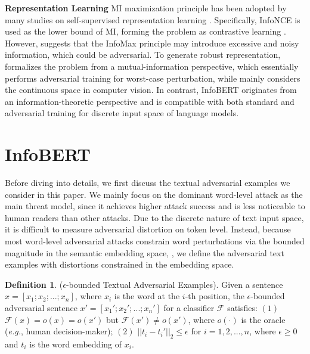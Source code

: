 \documentclass{article} \usepackage{iclr2021_conference,times}
\theoremstyle{definition}
\newtheorem{definition}{Definition}[section]
\theoremstyle{remark}
\newcommand{\method}{InfoBERT\xspace}
\newcommand{\modified}[1]{{\color{black}{#1}}}
\begin{document}
\textbf{Representation Learning} MI maximization principle has been adopted by many studies on self-supervised representation learning \citep{infonce,pmlr-v80-belghazi18a,hjelm2018learning,simclr}. Specifically, InfoNCE \citep{infonce} is used as the lower bound of MI, forming the problem as contrastive learning \citep{DBLP:conf/icml/SaunshiPAKK19, yu2020finetuning}. However, \citet{infomin} suggests that the InfoMax \citep{DBLP:journals/computer/Linsker88} principle may introduce excessive and noisy information, which could be adversarial. 
To generate robust representation, \citet{worstcase} formalizes the problem from a mutual-information perspective, which essentially performs adversarial training for worst-case perturbation, while mainly considers the continuous space in computer vision. In contrast, \method originates from an information-theoretic perspective and is compatible with both standard and adversarial training for discrete input space of language models.






%
 \vspace{-1mm}
\section{\method}
\vspace{-1mm}





Before diving into details, we  first discuss the textual adversarial examples we consider in this paper. We mainly focus on the dominant word-level  attack as the main threat model, since it achieves higher attack success and is less noticeable to human readers than other attacks. 
Due to the discrete nature of text input space, it is difficult to measure adversarial distortion on token level.
Instead, because most word-level adversarial attacks \citep{textbugger,textfooler} constrain word perturbations via the bounded magnitude in the semantic embedding space, \modified{by adapting from \citet{jacobsen2018excessive}}, we define the adversarial text examples with distortions constrained in the embedding space.




\begin{definition}\label{def:adv}($\epsilon$-bounded Textual Adversarial Examples). Given a sentence $x=[x_1;x_2;...;x_n]$, where $x_i$ is the word at the $i$-th position, the $\epsilon$-bounded adversarial sentence $x'=[x_1';x_2';...;x_n']$ for a classifier $\mathcal{F}$ satisfies: $(1)$ $\mathcal{F}(x) = o(x) = o(x')$ but $\mathcal{F}(x') \ne o(x')$, where $o(\cdot)$ is the oracle (\emph{e.g.}, human decision-maker); $(2)$ $||t_i - t_i'||_2 \le \epsilon$ for $i=1, 2, ..., n$, where $\epsilon \ge 0$ and $t_i$ is the word embedding of $x_i$. 
\end{definition}
\end{document}
